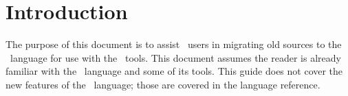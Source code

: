 
\section{Introduction}
\label{sec:intro}

The purpose of this document is to assist \CAST\ users in migrating
old sources to the \hac\ language for use with the \hackt\ tools.  
This document assumes the reader is already familiar with the \CAST\ language
and some of its tools.  
This guide does not cover the new features of the \hac\ language; 
those are covered in the language reference.  

